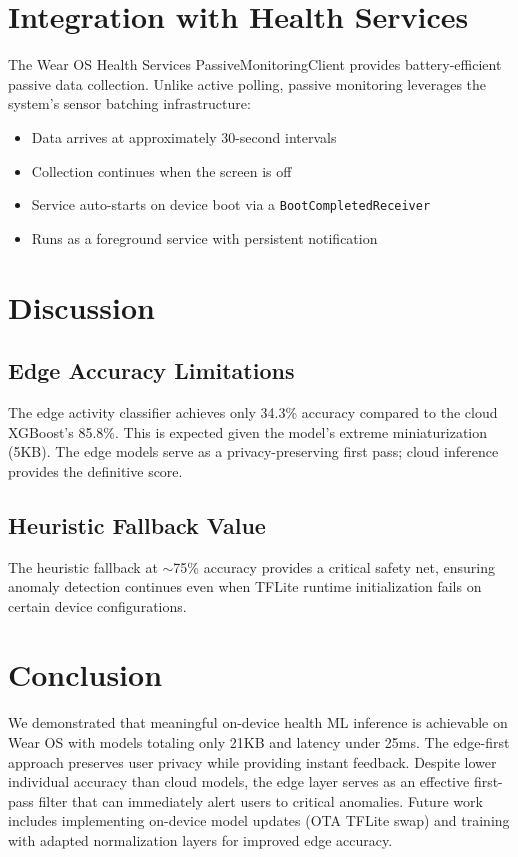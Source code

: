 \documentclass[conference]{IEEEtran}
\begin{document}
\section{Integration with Health Services}
The Wear OS Health Services PassiveMonitoringClient provides battery-efficient passive data collection. Unlike active polling, passive monitoring leverages the system's sensor batching infrastructure:

\begin{itemize}
    \item Data arrives at approximately 30-second intervals
    \item Collection continues when the screen is off
    \item Service auto-starts on device boot via a \texttt{BootCompletedReceiver}
    \item Runs as a foreground service with persistent notification
\end{itemize}

\section{Discussion}
\subsection{Edge Accuracy Limitations}
The edge activity classifier achieves only 34.3\% accuracy compared to the cloud XGBoost's 85.8\%. This is expected given the model's extreme miniaturization (5KB). The edge models serve as a privacy-preserving first pass; cloud inference provides the definitive score.

\subsection{Heuristic Fallback Value}
The heuristic fallback at $\sim$75\% accuracy provides a critical safety net, ensuring anomaly detection continues even when TFLite runtime initialization fails on certain device configurations.

\section{Conclusion}
We demonstrated that meaningful on-device health ML inference is achievable on Wear OS with models totaling only 21KB and latency under 25ms. The edge-first approach preserves user privacy while providing instant feedback. Despite lower individual accuracy than cloud models, the edge layer serves as an effective first-pass filter that can immediately alert users to critical anomalies. Future work includes implementing on-device model updates (OTA TFLite swap) and training with adapted normalization layers for improved edge accuracy.
\end{document}
